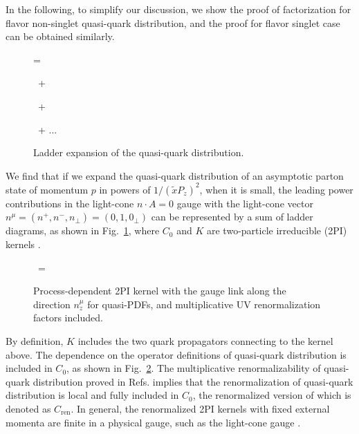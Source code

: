 \documentclass[twocolumn,aps,prl,superscriptaddress,nofootinbib,showpacs]{revtex4-1}
\begin{document}
In the following, to simplify our discussion, we show the proof of factorization for flavor non-singlet quasi-quark distribution, and the proof for flavor singlet case can be obtained similarly.
\begin{figure}[h]
\begin{minipage}[c]{0.6in}
\end{minipage}
= \
\begin{minipage}[c]{0.5in}
\end{minipage}
\ + \
\begin{minipage}[c]{0.5in}
\end{minipage}
\ + \
\begin{minipage}[c]{0.5in}
\end{minipage}
\ + ...
\caption{\label{fig:quasi-quark}
Ladder expansion of the quasi-quark distribution.}
\end{figure}
We find that if we expand the quasi-quark distribution of an asymptotic parton state of momentum $p$ in powers of $1/(\tilde{x}P_z)^2$, when it is small, the leading power contributions in the light-cone $n\cdot A=0$ gauge with the light-cone vector $n^\mu=(n^+,n^-,n_\perp)=(0,1,0_\perp)$ can be represented by a sum of ladder diagrams, as shown in Fig.~\ref{fig:quasi-quark}, where $C_0$ and $K$ are two-particle irreducible (2PI) kernels \cite{Ellis:1978ty}.
\begin{figure}[h]
\begin{minipage}[c]{0.8in}
\end{minipage}
\ = \
\begin{minipage}[c]{0.8in}
\end{minipage}
\caption{\label{fig:quasi-quark-q0}
Process-dependent 2PI kernel with the gauge link along the direction $n_z^\mu$ for quasi-PDFs, and multiplicative UV renormalization factors included.}
\end{figure}
By definition, $K$ includes the two quark propagators connecting to the kernel above. The dependence on the operator definitions of quasi-quark distribution is included in $C_0$, as shown in Fig.~\ref{fig:quasi-quark-q0}. The multiplicative renormalizability of quasi-quark distribution proved in Refs. \cite{Ji:2017oey,Ishikawa:2017faj,Green:2017xeu} implies that the renormalization of quasi-quark distribution is local and fully included in $C_0$, the renormalized version of which is denoted as $C_{\text{ren}}$.  In general, the renormalized 2PI kernels with fixed external momenta are finite in a physical gauge, such as the light-cone gauge \cite{Ellis:1978ty}.
\end{document}
